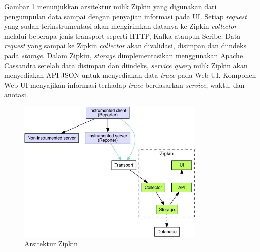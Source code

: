 Gambar \ref{zipkin-arch} menunjukkan arsitektur milik Zipkin yang digunakan dari pengumpulan data sampai dengan penyajian informasi pada UI. Setiap \textit{request} yang sudah terinstrumentasi akan mengirimkan datanya ke Zipkin \textit{collector} melalui beberapa jenis transport seperti HTTP, Kafka ataupun Scribe. Data \textit{request} yang sampai ke Zipkin \textit{collector} akan divalidasi, disimpan dan diindeks pada \textit{storage}. Dalam Zipkin, \textit{storage} dimplementasikan menggunakan Apache Cassandra setelah data disimpan dan diindeks, \textit{service query} milik Zipkin akan menyediakan API JSON untuk menyediakan data \textit{trace} pada Web UI. Komponen Web UI menyajikan informasi terhadap \textit{trace} berdasarkan \textit{service}, waktu, dan anotasi.
\begin{figure}[htb]
	\centering
	\includegraphics[width=0.8\textwidth]{resources/ch2/zipkin-arch.png}
	\caption{Arsitektur Zipkin \citep{zipkin}}
	\label{zipkin-arch}
\end{figure}








